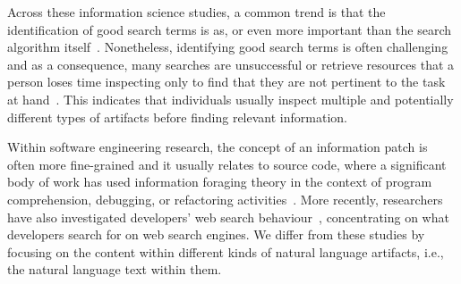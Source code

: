 









Across these information science studies, 
a common trend is that the identification of good search terms is as, or even more
important than the search algorithm itself~\cite{Kevic2014}. 
Nonetheless, identifying good search terms is often challenging and 
as a consequence, many searches are unsuccessful or retrieve resources that 
a person loses time inspecting only to find that they are not pertinent to the task at hand~\cite{novotny2004don, Haiduc2013}.
This indicates that individuals usually inspect multiple and potentially different types of artifacts 
before finding relevant information.




Within software engineering research, the concept of an information patch 
is often more fine-grained and it usually relates to source code, where a significant body of work has 
used information foraging theory in the context of 
program comprehension, debugging, or refactoring activities~\cite{fleming2013, lawrance2010, piorkowski2013, Ko2006a}. More recently, researchers have also investigated developers' web search 
behaviour~\cite{Starke2009, Brandt2009a, Xia2017}, concentrating on what developers search for on web search engines. 
We differ from these studies by focusing 
on the content within different kinds of natural language artifacts, i.e., 
the natural language text within them.






